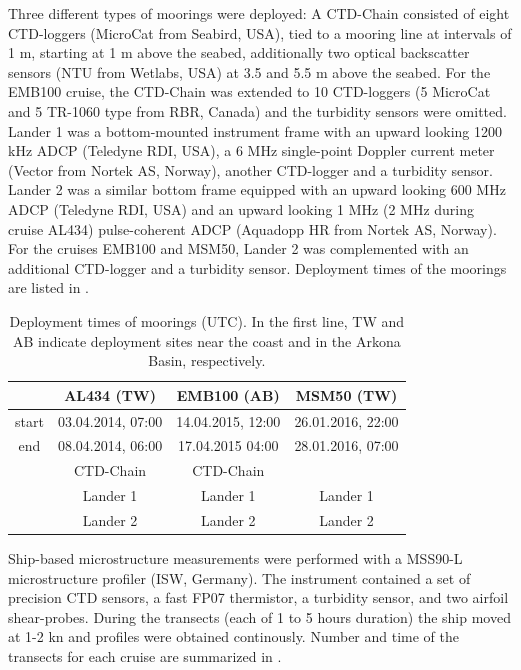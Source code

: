 Three different types of moorings were deployed: A CTD-Chain consisted of eight 
CTD-loggers (MicroCat from Seabird, USA), tied to a mooring line at intervals 
of 1 m, starting at 1 m above the seabed, additionally two optical 
backscatter sensors (NTU from Wetlabs, USA) at 3.5 and 5.5 m above the seabed. 
For the EMB100 cruise, the CTD-Chain was extended to 10 CTD-loggers (5 MicroCat 
and 5 TR-1060 type from RBR, Canada) and the turbidity sensors were omitted. 
Lander 1 was a bottom-mounted instrument frame with an upward looking 1200 kHz 
ADCP (Teledyne RDI, USA), a 6 MHz single-point Doppler current meter (Vector 
from Nortek AS, Norway), another CTD-logger and a turbidity sensor. Lander 2 
was a similar bottom frame equipped with an upward looking 600 MHz ADCP 
(Teledyne RDI, USA) and an upward looking 1 MHz (2 MHz during cruise AL434) 
pulse-coherent ADCP (Aquadopp HR from Nortek AS, Norway). For the cruises 
EMB100 and MSM50, Lander 2 was complemented with an additional CTD-logger and a 
turbidity sensor. Deployment times of the moorings are listed in 
.

 \begin{table}
\caption{Deployment times of moorings (UTC). In the first 
line, TW and AB indicate deployment sites near the coast and in the Arkona 
Basin, respectively.}\label{deployments}
\begin{center}
\begin{tabular}{cccc}
 & AL434 (TW) & EMB100 (AB) & MSM50 (TW) \\
 \hline
 start & 03.04.2014, 07:00 & 14.04.2015, 12:00 & 26.01.2016, 22:00 \\ 
 end & 08.04.2014, 06:00 & 17.04.2015 04:00 & 28.01.2016, 07:00 \\
\hline
 & CTD-Chain & CTD-Chain & \\
 & Lander 1 & Lander 1 & Lander 1\\
 & Lander 2 & Lander 2 & Lander 2\\
\end{tabular}
\end{center}
\end{table}

Ship-based microstructure measurements were performed with a MSS90-L 
microstructure profiler (ISW, Germany). The instrument contained a set of 
precision CTD sensors, a fast FP07 thermistor, a turbidity sensor, and two 
airfoil shear-probes. During the transects (each of 1 to 5 hours duration) the 
ship moved at 1-2 kn and profiles were obtained continously. Number and time of 
the transects for each cruise are summarized in .


